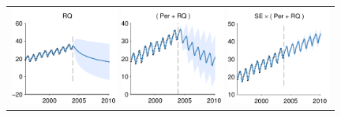 \begin{figure}[H]
\centering
\newcommand{\wmg}{0.39\columnwidth}  %
\newcommand{\hmg}{3.2cm}  %
\begin{tabular}{c}
\hspace{-0.7cm} \includegraphics[width=\wmg,height=\hmg]{../figures/decomposition/11-Feb-v4-03-mauna2003-s_max_level_0/03-mauna2003-s_all_small} 
\hspace{-0.7cm} \includegraphics[width=\wmg,height=\hmg]{../figures/decomposition/11-Feb-v4-03-mauna2003-s_max_level_1/03-mauna2003-s_all_small}
\hspace{-0.7cm} \includegraphics[width=\wmg,height=\hmg]{../figures/decomposition/11-Feb-v4-03-mauna2003-s_max_level_2/03-mauna2003-s_all_small}

\end{tabular}
\end{figure}
